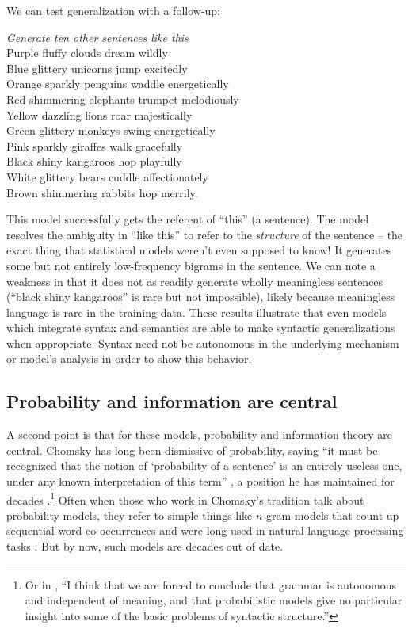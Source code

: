 \documentclass[output=paper,colorlinks,citecolor=brown
]{langscibook}
\begin{document}
\noindent We can test generalization with a follow-up:

\begin{myquote}
\textit{Generate ten other sentences like this}\medskip\\
\noindent Purple fluffy clouds dream wildly\\
Blue glittery unicorns jump excitedly\\
Orange sparkly penguins waddle energetically\\
Red shimmering elephants trumpet melodiously\\
Yellow dazzling lions roar majestically\\
Green glittery monkeys swing energetically\\
Pink sparkly giraffes walk gracefully\\
Black shiny kangaroos hop playfully\\
White glittery bears cuddle affectionately\\
Brown shimmering rabbits hop merrily.
\end{myquote}

\noindent This model successfully gets the referent of ``this'' (a sentence). The model resolves the ambiguity in ``like this'' to refer to the \textit{structure} of the sentence -- the exact thing that statistical models weren't even supposed to know! It generates some but not entirely low-frequency bigrams in the sentence. We can note a weakness in that it does not as readily generate wholly meaningless sentences (``black shiny kangaroos'' is rare but not impossible), likely because meaningless language is rare in the training data. These results illustrate that even models which integrate syntax and semantics are able to make syntactic generalizations when appropriate. Syntax need not be autonomous in the underlying mechanism or model's analysis in order to show this behavior. 

\subsection{Probability and information are central}

A second point is that for these models, probability and information theory are central. Chomsky has long been dismissive of probability, saying ``it must be recognized that the notion of ‘probability of a sentence’ is an entirely useless one, under any known interpretation of this term'' \citep{chomsky1969quine}, a position he has maintained for decades \citep{norvig2012colorless}.\footnote{Or in , ``I think that we are forced to conclude that grammar is autonomous and independent of meaning, and that probabilistic models give no particular insight into some of the basic problems of syntactic structure.''} Often when those who work in Chomsky's 
tradition talk about probability models, they refer to simple things like  $n$-gram models that count up sequential word co-occurrences and were long used in natural language processing tasks \citep{chen1999empirical,manning1999foundations}. But by now, such models are decades out of date. 
\end{document}
